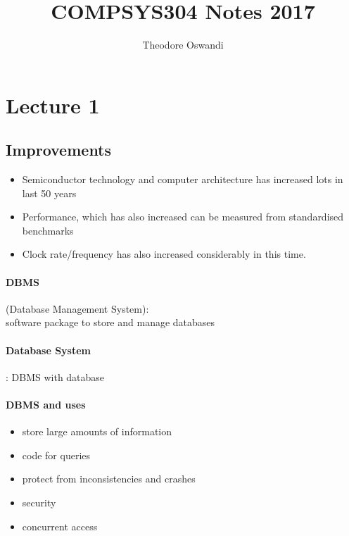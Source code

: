 \documentclass{article}
\title{COMPSYS304 Notes 2017}
\author{Theodore Oswandi}
\begin{document}
 \maketitle{} 

\section{Lecture 1}
	\subsection{Improvements}
		\begin{itemize}
			\item Semiconductor technology and computer architecture has increased lots in last 50 years
			\item Performance, which has also increased can be measured from standardised benchmarks
			\item Clock rate/frequency has also increased considerably in this time.
		\end{itemize}

		\paragraph{DBMS}(Database Management System): 
		\\ software package to store and manage databases

		\paragraph{Database System}: DBMS with database

		\paragraph{DBMS and uses}
		\begin{itemize}
			\item store large amounts of information
			\item code for queries
			\item protect from inconsistencies and crashes
			\item security
			\item concurrent access
		\end{itemize}
\end{document}
